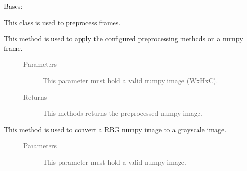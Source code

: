 \documentclass[letterpaper,10pt,english]{sphinxmanual}
\begin{document}
\begin{fulllineitems}
\label{\detokenize{PreProcessing:cmc.PreProcessing.PreProcessing}}
Bases: 

This class is used to pre\sphinxhyphen{}process frames.

\begin{fulllineitems}
\label{\detokenize{PreProcessing:cmc.PreProcessing.PreProcessing.applyTransformOnImg}}
This method is used to apply the configured pre\sphinxhyphen{}processing methods on a numpy frame.
\begin{quote}\begin{description}
\item[{Parameters}] \leavevmode
{} \textendash{} This parameter must hold a valid numpy image (WxHxC).

\item[{Returns}] \leavevmode
This methods returns the preprocessed numpy image.

\end{description}\end{quote}

\end{fulllineitems}


\begin{fulllineitems}
\label{\detokenize{PreProcessing:cmc.PreProcessing.PreProcessing.convertRGB2Gray}}
This method is used to convert a RBG numpy image to a grayscale image.
\begin{quote}\begin{description}
\item[{Parameters}] \leavevmode
{} \textendash{} This parameter must hold a valid numpy image.


\end{description}
\end{quote}
\end{fulllineitems}
\end{fulllineitems}
\end{document}
